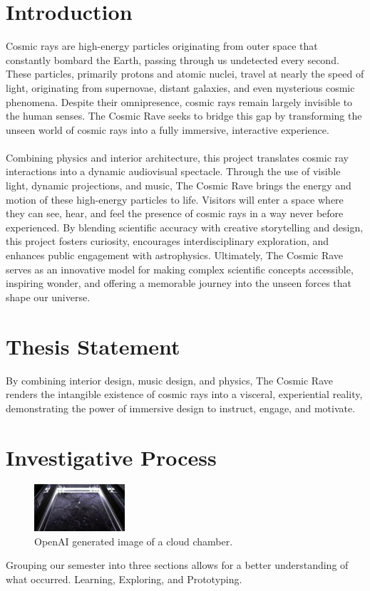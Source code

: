 \documentclass{article}
\begin{document}
\section{Introduction}
Cosmic rays are high-energy particles originating from outer space that constantly bombard the Earth, passing through us undetected every second. These particles, primarily protons and atomic nuclei, travel at nearly the speed of light, originating from supernovae, distant galaxies, and even mysterious cosmic phenomena. Despite their omnipresence, cosmic rays remain largely invisible to the human senses. The Cosmic Rave seeks to bridge this gap by transforming the unseen world of cosmic rays into a fully immersive, interactive experience.
\\
\\  Combining physics and interior architecture, this project translates cosmic ray interactions into a dynamic audiovisual spectacle. Through the use of visible light, dynamic projections, and music, The Cosmic Rave brings the energy and motion of these high-energy particles to life. Visitors will enter a space where they can see, hear, and feel the presence of cosmic rays in a way never before experienced. By blending scientific accuracy with creative storytelling and design, this project fosters curiosity, encourages interdisciplinary exploration, and enhances public engagement with astrophysics. Ultimately, The Cosmic Rave serves as an innovative model for making complex scientific concepts accessible, inspiring wonder, and offering a memorable journey into the unseen forces that shape our universe.

\section{Thesis Statement}
By combining interior design, music design, and physics, The Cosmic Rave renders the intangible existence of cosmic rays into a visceral, experiential reality, demonstrating the power of immersive design to instruct, engage, and motivate.

\section{Investigative Process}
\begin{figure}
  \begin{center}
    \includegraphics[width=0.3\textwidth]{1}
  \end{center}
  \caption{OpenAI generated image of a cloud chamber.}
\end{figure}
Grouping our semester into three sections allows for a better understanding of what occurred. Learning, Exploring, and Prototyping. 
\end{document}
